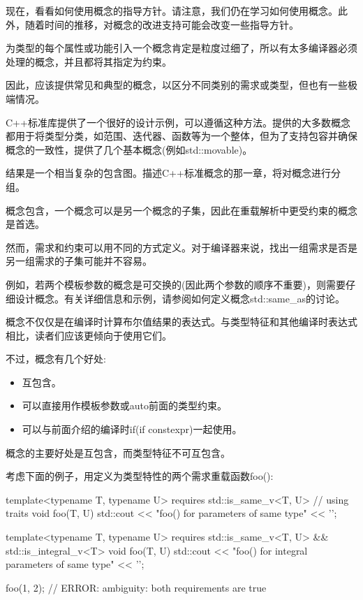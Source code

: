 
现在，看看如何使用概念的指导方针。请注意，我们仍在学习如何使用概念。此外，随着时间的推移，对概念的改进支持可能会改变一些指导方针。


为类型的每个属性或功能引入一个概念肯定是粒度过细了，所以有太多编译器必须处理的概念，并且都将其指定为约束。

因此，应该提供常见和典型的概念，以区分不同类别的需求或类型，但也有一些极端情况。

C++标准库提供了一个很好的设计示例，可以遵循这种方法。提供的大多数概念都用于将类型分类，如范围、迭代器、函数等为一个整体，但为了支持包容并确保概念的一致性，提供了几个基本概念(例如std::movable)。

结果是一个相当复杂的包含图。描述C++标准概念的那一章，将对概念进行分组。


概念包含，一个概念可以是另一个概念的子集，因此在重载解析中更受约束的概念是首选。

然而，需求和约束可以用不同的方式定义。对于编译器来说，找出一组需求是否是另一组需求的子集可能并不容易。

例如，若两个模板参数的概念是可交换的(因此两个参数的顺序不重要)，则需要仔细设计概念。有关详细信息和示例，请参阅如何定义概念std::same\_as的讨论。


概念不仅仅是在编译时计算布尔值结果的表达式。与类型特征和其他编译时表达式相比，读者们应该更倾向于使用它们。

不过，概念有几个好处:

\begin{itemize}
\item
互包含。

\item
可以直接用作模板参数或auto前面的类型约束。

\item
可以与前面介绍的编译时if(if constexpr)一起使用。
\end{itemize}


概念的主要好处是互包含，而类型特征不可互包含。

考虑下面的例子，用定义为类型特性的两个需求重载函数foo():

\begin{cpp}
template<typename T, typename U>
requires std::is_same_v<T, U> // using traits
void foo(T, U)
{
	std::cout << "foo() for parameters of same type" << '\n';
}

template<typename T, typename U>
requires std::is_same_v<T, U> && std::is_integral_v<T>
void foo(T, U)
{
	std::cout << "foo() for integral parameters of same type" << '\n';
}

foo(1, 2); // ERROR: ambiguity: both requirements are true
\end{cpp}

